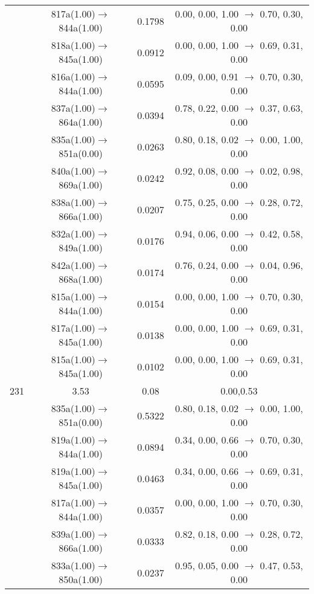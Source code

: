 \documentclass[10pt,a4paper]{article}
\begin{document}
\begin{longtable}{c|c|c|c}
 	& 817a(1.00)$\rightarrow$844a(1.00) &	 0.1798 &	 0.00, 0.00, 1.00 $\rightarrow$ 0.70, 0.30, 0.00 \\ 
 	& 818a(1.00)$\rightarrow$845a(1.00) &	 0.0912 &	 0.00, 0.00, 1.00 $\rightarrow$ 0.69, 0.31, 0.00 \\ 
 	& 816a(1.00)$\rightarrow$844a(1.00) &	 0.0595 &	 0.09, 0.00, 0.91 $\rightarrow$ 0.70, 0.30, 0.00 \\ 
 	& 837a(1.00)$\rightarrow$864a(1.00) &	 0.0394 &	 0.78, 0.22, 0.00 $\rightarrow$ 0.37, 0.63, 0.00 \\ 
 	& 835a(1.00)$\rightarrow$851a(0.00) &	 0.0263 &	 0.80, 0.18, 0.02 $\rightarrow$ 0.00, 1.00, 0.00 \\ 
 	& 840a(1.00)$\rightarrow$869a(1.00) &	 0.0242 &	 0.92, 0.08, 0.00 $\rightarrow$ 0.02, 0.98, 0.00 \\ 
 	& 838a(1.00)$\rightarrow$866a(1.00) &	 0.0207 &	 0.75, 0.25, 0.00 $\rightarrow$ 0.28, 0.72, 0.00 \\ 
 	& 832a(1.00)$\rightarrow$849a(1.00) &	 0.0176 &	 0.94, 0.06, 0.00 $\rightarrow$ 0.42, 0.58, 0.00 \\ 
 	& 842a(1.00)$\rightarrow$868a(1.00) &	 0.0174 &	 0.76, 0.24, 0.00 $\rightarrow$ 0.04, 0.96, 0.00 \\ 
 	& 815a(1.00)$\rightarrow$844a(1.00) &	 0.0154 &	 0.00, 0.00, 1.00 $\rightarrow$ 0.70, 0.30, 0.00 \\ 
 	& 817a(1.00)$\rightarrow$845a(1.00) &	 0.0138 &	 0.00, 0.00, 1.00 $\rightarrow$ 0.69, 0.31, 0.00 \\ 
 	& 815a(1.00)$\rightarrow$845a(1.00) &	 0.0102 &	 0.00, 0.00, 1.00 $\rightarrow$ 0.69, 0.31, 0.00 \\ 
 \hline231 &	 3.53 &	 0.08 &	 0.00,0.53 \\ 
  	& 835a(1.00)$\rightarrow$851a(0.00) &	 0.5322 &	 0.80, 0.18, 0.02 $\rightarrow$ 0.00, 1.00, 0.00 \\ 
 	& 819a(1.00)$\rightarrow$844a(1.00) &	 0.0894 &	 0.34, 0.00, 0.66 $\rightarrow$ 0.70, 0.30, 0.00 \\ 
 	& 819a(1.00)$\rightarrow$845a(1.00) &	 0.0463 &	 0.34, 0.00, 0.66 $\rightarrow$ 0.69, 0.31, 0.00 \\ 
 	& 817a(1.00)$\rightarrow$844a(1.00) &	 0.0357 &	 0.00, 0.00, 1.00 $\rightarrow$ 0.70, 0.30, 0.00 \\ 
 	& 839a(1.00)$\rightarrow$866a(1.00) &	 0.0333 &	 0.82, 0.18, 0.00 $\rightarrow$ 0.28, 0.72, 0.00 \\ 
 	& 833a(1.00)$\rightarrow$850a(1.00) &	 0.0237 &	 0.95, 0.05, 0.00 $\rightarrow$ 0.47, 0.53, 0.00 \\ 

\end{longtable}
\end{document}
